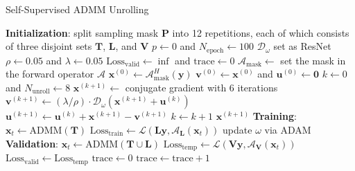 \documentclass[AMA,STIX2COL,Linenumberson]{MRM}
\begin{document}
\begin{algorithm}
	\caption{Self-Supervised ADMM Unrolling} \label{ALG:ADMM}
	\begin{algorithmic}[1]
		\State \textbf{Initialization}:
		\State \;\; split sampling mask $\mathbf{P}$ into 12 repetitions, each of which consists of three disjoint sets $\mathbf{T}$, $\mathbf{L}$, and $\mathbf{V}$
		\State \;\: $p \gets 0$ and $N_{\mathrm{epoch}} \gets 100$
		\State \;\; $\mathcal{D}_{\omega}$ set as ResNet
		\State \;\; $\rho \gets 0.05$ and $\lambda \gets 0.05$
		\State \;\; $\mathrm{Loss}_{\mathrm{valid}} \gets \inf$ and $\mathrm{trace} \gets 0$
		\State $\mathcal{A}_\mathrm{mask} \gets$ set the mask in the forward operator $\mathcal{A}$
		\State $\mathbf{x}^{(0)} \gets \mathcal{A}_\mathrm{mask}^H (\mathbf{y})$
		\State $\mathbf{v}^{(0)} \gets \mathbf{x}^{(0)}$ and $\mathbf{u}^{(0)} \gets \mathbf{0}$
		\State $k \gets 0$ and $N_{\mathrm{unroll}} \gets 8$
		\State $\mathbf{x}^{(k+1)} \gets $ conjugate gradient with 6 iterations
		\State $\mathbf{v}^{(k+1)} \gets (\lambda/\rho) \cdot \mathcal{D}_{\omega} (\mathbf{x}^{(k+1)} + \mathbf{u}^{(k)})$
		\State $\mathbf{u}^{(k+1)} \gets \mathbf{u}^{(k)} + \mathbf{x}^{(k+1)} - \mathbf{v}^{(k+1)}$
		\State $k \gets k+1$
		\EndWhile
		\State \Return $\mathbf{x}^{(k+1)}$
		\EndFunction
		\State \textbf{Training}:
		\State $\mathbf{x}_t \gets \mathrm{ADMM}(\mathbf{T})$
		\State $\mathrm{Loss}_{\mathrm{train}} \gets \mathcal{L}(\mathbf{L} \mathbf{y}, \mathcal{A}_\mathbf{L}(\mathbf{x}_t))$
		\State update $\omega$ via ADAM
		\State \textbf{Validation}:
		\State $\mathbf{x}_t \gets \mathrm{ADMM}(\mathbf{T} \cup \mathbf{L})$
		\State $\mathrm{Loss}_{\mathrm{temp}} \gets \mathcal{L}(\mathbf{V} \mathbf{y}, \mathcal{A}_\mathbf{V}(\mathbf{x}_t))$
		\State $\mathrm{Loss}_{\mathrm{valid}} \gets \mathrm{Loss}_{\mathrm{temp}}$
		\State $\mathrm{trace} \gets 0$
		\Else
		\State $\mathrm{trace} \gets \mathrm{trace} + 1$
		\EndIf
		\EndWhile
	\end{algorithmic}
\end{algorithm}
\end{document}

